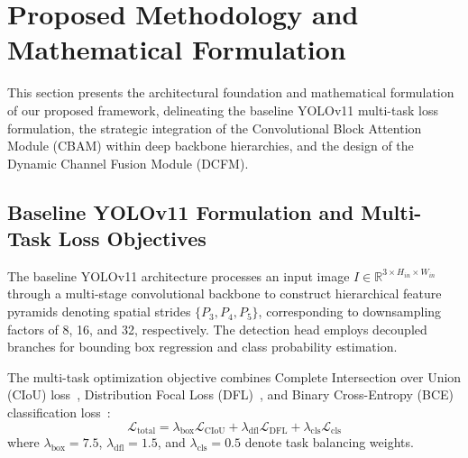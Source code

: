 \documentclass[pdflatex,sn-mathphys]{sn-jnl}
\begin{document}
\section{Proposed Methodology and Mathematical Formulation}\label{sec:method}

This section presents the architectural foundation and mathematical formulation of our proposed framework, delineating the baseline YOLOv11 multi-task loss formulation, the strategic integration of the Convolutional Block Attention Module (CBAM) within deep backbone hierarchies, and the design of the Dynamic Channel Fusion Module (DCFM).

\subsection{Baseline YOLOv11 Formulation and Multi-Task Loss Objectives}\label{subsec:loss}

The baseline YOLOv11 architecture processes an input image $I \in \mathbb{R}^{3 \times H_{in} \times W_{in}}$ through a multi-stage convolutional backbone to construct hierarchical feature pyramids denoting spatial strides $\{P_3, P_4, P_5\}$, corresponding to downsampling factors of 8, 16, and 32, respectively. The detection head employs decoupled branches for bounding box regression and class probability estimation.

The multi-task optimization objective combines Complete Intersection over Union (CIoU) loss~\cite{zheng2020distance,gevorgyan2022siou}, Distribution Focal Loss (DFL)~\cite{li2020generalized}, and Binary Cross-Entropy (BCE) classification loss~\cite{zhang2021varifocalnet}:
\begin{equation}
\mathcal{L}_{\text{total}} = \lambda_{\text{box}} \mathcal{L}_{\text{CIoU}} + \lambda_{\text{dfl}} \mathcal{L}_{\text{DFL}} + \lambda_{\text{cls}} \mathcal{L}_{\text{cls}}
\label{eq:total_loss}
\end{equation}
where $\lambda_{\text{box}} = 7.5$, $\lambda_{\text{dfl}} = 1.5$, and $\lambda_{\text{cls}} = 0.5$ denote task balancing weights.
\end{document}
